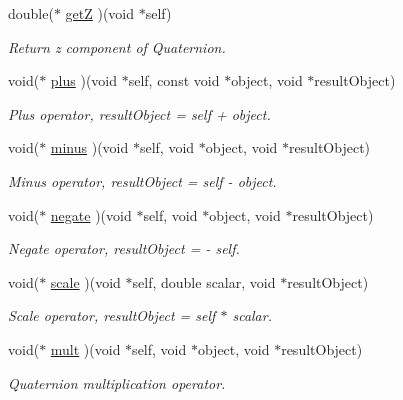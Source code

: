\begin{CompactItemize}
double($\ast$ \hyperlink{structdrdc__Orient__t_4cb25960d5d86860b503b3142fce5759}{getZ} )(void $\ast$self)
\begin{CompactList}\small\item\em Return z component of Quaternion. \item\end{CompactList}\item 
void($\ast$ \hyperlink{structdrdc__Orient__t_87eca4fac4d681f036865d3197b38967}{plus} )(void $\ast$self, const void $\ast$object, void $\ast$resultObject)
\begin{CompactList}\small\item\em Plus operator, resultObject = self + object. \item\end{CompactList}\item 
void($\ast$ \hyperlink{structdrdc__Orient__t_8bc82fdd134eeaf579ab7ea98cbb8613}{minus} )(void $\ast$self, void $\ast$object, void $\ast$resultObject)
\begin{CompactList}\small\item\em Minus operator, resultObject = self - object. \item\end{CompactList}\item 
void($\ast$ \hyperlink{structdrdc__Orient__t_6bf2cf45abcb88fa36e006091f9b9f7d}{negate} )(void $\ast$self, void $\ast$object, void $\ast$resultObject)
\begin{CompactList}\small\item\em Negate operator, resultObject = - self. \item\end{CompactList}\item 
void($\ast$ \hyperlink{structdrdc__Orient__t_20bb85a9a44ee33c191386b0d8b03a38}{scale} )(void $\ast$self, double scalar, void $\ast$resultObject)
\begin{CompactList}\small\item\em Scale operator, resultObject = self $\ast$ scalar. \item\end{CompactList}\item 
void($\ast$ \hyperlink{structdrdc__Orient__t_eca47781207092b889d7d7b8aaabff5a}{mult} )(void $\ast$self, void $\ast$object, void $\ast$resultObject)
\begin{CompactList}\small\item\em Quaternion multiplication operator. \item\end{CompactList}\item 

\end{CompactItemize}

